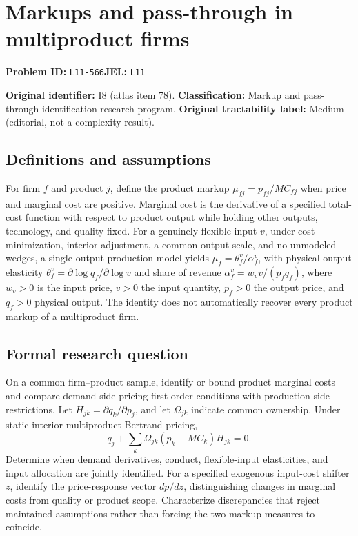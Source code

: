 \documentclass[11pt,a4paper]{article}
\begin{document}
\section*{Markups and pass-through in multiproduct firms}
\textbf{Problem ID:} \texttt{L11-566}\quad \textbf{JEL:} \texttt{L11}\par
\label{problem:OP-0078}
\label{atlas:prob:I8}

\noindent\textbf{Original identifier:} I8 (atlas item 78). \textbf{Classification:} Markup and pass-through identification research program. \textbf{Original tractability label:} Medium (editorial, not a complexity result).

\subsection*{Definitions and assumptions}

For firm $f$ and product $j$, define the product markup $\mu_{fj}=p_{fj}/MC_{fj}$ when price and marginal cost are positive. Marginal cost is the derivative of a specified total-cost function with respect to product output while holding other outputs, technology, and quality fixed. For a genuinely flexible input $v$, under cost minimization, interior adjustment, a common output scale, and no unmodeled wedges, a single-output production model yields $\mu_f=\theta_f^v/\alpha_f^v$, with physical-output elasticity $\theta_f^v=\partial\log q_f/\partial\log v$ and share of revenue $\alpha_f^v=w_vv/(p_fq_f)$, where $w_v>0$ is the input price, $v>0$ the input quantity, $p_f>0$ the output price, and $q_f>0$ physical output. The identity does not automatically recover every product markup of a multiproduct firm.

\subsection*{Formal research question}

On a common firm--product sample, identify or bound product marginal costs and compare demand-side pricing first-order conditions with production-side restrictions. Let $H_{jk}=\partial q_k/\partial p_j$, and let $\Omega_{jk}$ indicate common ownership. Under static interior multiproduct Bertrand pricing,
\[
q_j+\sum_k\Omega_{jk}(p_k-MC_k)H_{jk}=0.
\]
Determine when demand derivatives, conduct, flexible-input elasticities, and input allocation are jointly identified. For a specified exogenous input-cost shifter $z$, identify the price-response vector $dp/dz$, distinguishing changes in marginal costs from quality or product scope. Characterize discrepancies that reject maintained assumptions rather than forcing the two markup measures to coincide.
\end{document}
